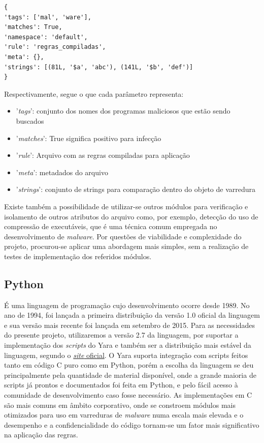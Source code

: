 \begin{lstlisting}[caption=Conteúdo dos arquivos de resultado de varredura, label=resultyara]
{
'tags': ['mal', 'ware'],
'matches': True,
'namespace': 'default',
'rule': 'regras_compiladas',
'meta': {},
'strings': [(81L, '$a', 'abc'), (141L, '$b', 'def')]
}
\end{lstlisting}

Respectivamente, segue o que cada parâmetro representa:
\begin{itemize}
	\item '\textit{tags}': conjunto dos nomes dos programas maliciosos que estão sendo buscados

	\item '\textit{matches}': True significa positivo para infecção

	\item '\textit{rule}': Arquivo com as regras compiladas para aplicação

	\item '\textit{meta}': metadados do arquivo

	\item '\textit{strings}': conjunto de strings para comparação dentro do objeto de varredura
\end{itemize}

Existe também a possibilidade de utilizar-se outros módulos para verificação e
isolamento de outros atributos do arquivo como, por exemplo, detecção do uso de
compressão de executáveis, que é uma técnica comum empregada no desenvolvimento
de \textit{malware}. Por questões de viabilidade e complexidade do projeto,
procurou-se aplicar uma abordagem mais simples, sem a realização de testes de
implementação dos referidos módulos.

\subsection{Python}
\label{sub:python}

É uma linguagem de programação cujo desenvolvimento ocorre desde 1989. No ano de
1994, foi lançada a primeira distribuição da versão 1.0 oficial da linguagem e
sua versão mais recente foi lançada em setembro de 2015. Para as necessidades do
presente projeto, utilizaremos a versão 2.7 da linguagem, por suportar a
implementação dos \textit{scripts} do Yara e também ser a distribuição mais
estável da linguagem, segundo o \href{www.python.org}{\textit{site} oficial}. O
Yara suporta integração com scripts feitos tanto em código C puro como em
Python, porém a escolha da linguagem se deu principalmente pela quantidade de
material disponível, onde a grande maioria de scripts já prontos e documentados
foi feita em Python,  e pelo fácil acesso à comunidade de desenvolvimento caso
fosse necessário. As implementações em C são mais comuns em âmbito corporativo,
onde se constroem módulos mais otimizados para uso em varreduras de
\textit{malware} numa escala mais elevada e o desempenho e a confidencialidade
do código tornam-se um fator mais significativo na aplicação das regras.

